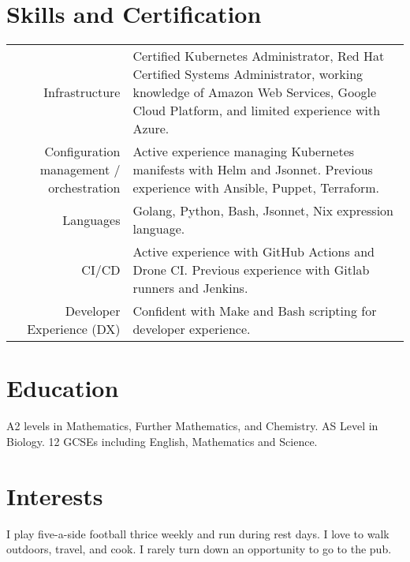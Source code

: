 \documentclass{cv}
\begin{document}
\section{Skills and Certification}
\renewcommand{\arraystretch}{1.5}
%
\begin{tabularx}{\textwidth}{ r|L }
  Infrastructure & Certified Kubernetes Administrator, Red Hat Certified Systems Administrator, working knowledge of Amazon Web Services, Google Cloud Platform, and limited experience with Azure. \\
  Configuration management / orchestration & Active experience managing Kubernetes manifests with Helm and Jsonnet. Previous experience with Ansible, Puppet, Terraform. \\
  Languages & Golang, Python, Bash, Jsonnet, Nix expression language. \\
  CI/CD & Active experience with GitHub Actions and Drone CI. Previous experience with Gitlab runners and Jenkins. \\
  Developer Experience (DX) & Confident with Make and Bash scripting for developer experience.
\end{tabularx}

\section{Education}
A2 levels in Mathematics, Further Mathematics, and Chemistry. AS Level in Biology. 12 GCSEs including English, Mathematics and Science.

\section{Interests}
I play five-a-side football thrice weekly and run during rest days.
I love to walk outdoors, travel, and cook.
I rarely turn down an opportunity to go to the pub.
\end{document}
